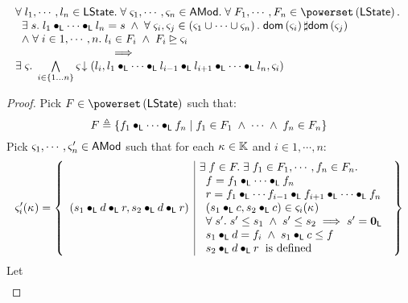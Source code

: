 \newpage	
\begin{lemma}[]\label{lem:amodWitness}
%
\[
\begin{array}{l}
	\for{l_1,\cdots,l_n \in \LState}\for{\amod{1},\cdots,\amod{n} \in \AMods}\for{F_1, \cdots,F_n \in \pset{\LState}}\\
	\hspace*{0.2cm} \exsts{s} l_1 \composeL  \cdots \composeL l_n = s \;\land\; \for{\amod{i}, \amod{j} \in \left(\amod{1} \cup \cdots \cup \amod{n}\right)} \dom{\amod{i}} \disjoint \dom{\amod{j}}\\
	\hspace*{0.2cm}\land\; \for{i \in 1, \cdots, n} l_i \in F_i \;\land\; F_i \strictfences \amod{i}\\
	\hspace*{3cm}\implies\\
	\exsts{\amod{}} \bigwedge\limits_{i \in \{1...n\}} \extendsAM{\amod{}}{l_i}{l_1\composeL \cdots \composeL l_{i-1} \composeL l_{i+1}\composeL \cdots \composeL l_{n}}{\amod{i}}
\end{array}
\]
%
\begin{proof}
Pick $F \in \pset{\LState}$ such that:
%
\[
	F \triangleq
	\left\{
		f_1 \bullet_{\textsf{L}} \cdots \bullet_{\textsf{L}} f_n \;|\;
		f_1 \in F_1 \;\land\; \cdots \;\land\; f_n \in F_n
	\right\}
\]
%
Pick $\varsigma_{1}, \cdots, \varsigma_{n}' \in \textsf{AMod}$ such that for each $\kappa_{} \in \mathbb{K}$ and $i \in 1, \cdots, n$:
%
\[
\amod{i}'(\ca{}) =
\left\{
	\begin{array}{l | l}
		(s_1 \composeL d \composeL r, s_2 \composeL d \composeL r)
		&
		\begin{array}{l}
			\hspace*{-0.2cm} \exsts{f \in F} \exsts{f_1 \in F_1, \cdots, f_n \in F_n}\\
			f = f_1 \composeL \cdots \composeL f_n\\
			r = f_1 \composeL \cdots f_{i-1} \composeL f_{i+1} \composeL \cdots \composeL f_n\\
			(s_1 \composeL c, s_2 \composeL c) \in \amod{i}(\ca{})\\
			\for{s'} s' \leq s_1 \;\land\; s' \leq s_2 \implies s' = \unitL\\
			s_1 \composeL d = f_i \;\land\; s_1 \composeL c \leq f\\
			s_2 \composeL d \composeL r \hspace*{0.2cm} \text{is defined}
		\end{array}
	\end{array}
\right\}
\]
%
Let 
%
\begin{align}

\end{align}
\end{proof}
\end{lemma}
